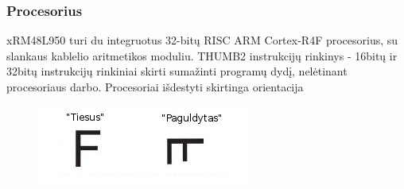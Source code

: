 \documentclass[a4paper, 12pt]{article} %
\begin{document}
\begin{onehalfspacing}
\subsubsection{Procesorius}
xRM48L950 turi du integruotus 32-bit\k{u} RISC ARM Cortex-R4F procesorius, su slankaus kablelio aritmetikos moduliu. THUMB2 instrukcij\k{u} rinkinys - 16bit\k{u} ir 32bit\k{u} instrukcij\k{u} rinkiniai skirti suma\v{z}inti program\k{u} dyd\k{i}, nel\.etinant procesoriaus darbo. Procesoriai i\v{s}destyti skirtinga orientacija  
\begin{figure}[H] %
\centering %
\includegraphics[scale=2.5]{pav/orentacija.jpg} %
\captionsetup{labelformat=numbfirst} %
\captionsetup{labelseparator=tarpas}



\end{figure}
\end{onehalfspacing}
\end{document}
